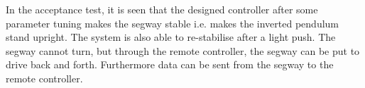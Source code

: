 In the acceptance test, it is seen that the designed controller after some parameter tuning makes the segway stable i.e. makes the inverted pendulum stand upright. The system is also able to re-stabilise after a light push. The segway cannot turn, but through the remote controller, the segway can be put to drive back and forth. Furthermore data can be sent from the segway to the remote controller.